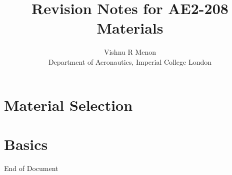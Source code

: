\documentclass{summary_notes}
\begin{document}
\title{\bf Revision Notes for AE2-208 Materials}
\author{Vishnu R Menon\\ 
\small{Department of Aeronautics, Imperial College London}}
\maketitle
\begin{multicols*}{2}
\tableofcontents
\end{multicols*}
\newpage

\setcounter{chapter}{-1}
\chapter{Material Selection}
\begin{multicols*}{2}


\end{multicols*}


\chapter{Basics}
\begin{multicols*}{2}






\end{multicols*}
\newpage
End of Document
\end{document}
